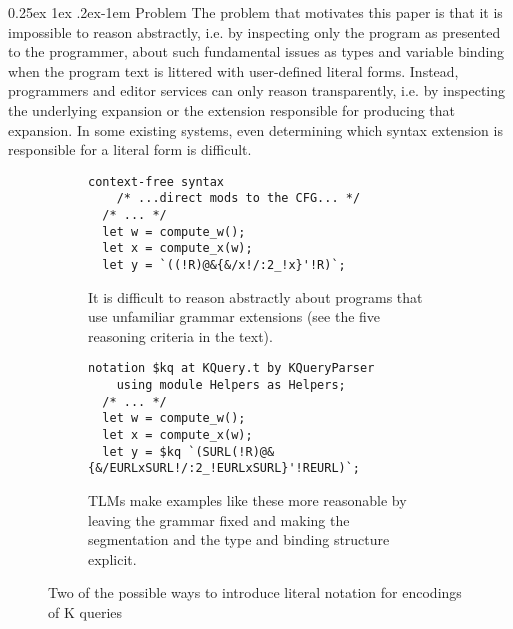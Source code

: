 \documentclass[acmsmall,review,anonymous]{acmart}\settopmatter{printfolios=true,printccs=false,printacmref=false}
\makeatletter
\renewcommand{\paragraph}{%
  \@startsection{paragraph}{4}%
  {\z@}{0.25ex \@plus 1ex \@minus .2ex}{-1em}%
  {\normalfont\normalsize\bfseries}%
}
\makeatother
\begin{document}
\paragraph{Problem} The problem that motivates this paper is that it is impossible to reason abstractly, i.e. by inspecting only the program as presented to the programmer, about such fundamental issues as types and variable binding when the program text is littered with  user-defined literal forms. Instead, programmers and editor services can only reason transparently, i.e. by inspecting the underlying expansion or the extension responsible for producing that expansion. In some existing systems, even determining which syntax extension is responsible for a literal form is difficult.
\newcommand*\Suppressnumber{%
  \lst@AddToHook{OnNewLine}{%
    \let\thelstnumber\relax%
     \advance\c@lstnumber-\@ne\relax%
    }%
}

\newcommand*\Reactivatenumber{%
  \lst@AddToHook{OnNewLine}{%
   \let\thelstnumber\origthelstnumber%
   \advance\c@lstnumber\@ne\relax}%
}


\begin{figure}[t!]
\begin{subfigure}[t]{0.48\textwidth}
\begin{lstlisting}[xleftmargin=-2pt, morekeywords={context,free,syntax}]
  context-free syntax 
    /* ...direct mods to the CFG... */
  /* ... */
  let w = compute_w();
  let x = compute_x(w);
  let y = `((!R)@&{&/x!/:2_!x}'!R)`;
\end{lstlisting}
\vspace{-5px}
\caption{It is difficult to reason abstractly about programs that use unfamiliar grammar extensions (see the five reasoning criteria in the text).}
\label{fig:K-dialect}
\end{subfigure}
\hfill
\begin{subfigure}[t]{0.51\textwidth}
\begin{lstlisting}[xleftmargin=-2pt]
  notation $kq at KQuery.t by KQueryParser 
    using module Helpers as Helpers;
  /* ... */
  let w = compute_w();
  let x = compute_x(w);
  let y = $kq `(SURL(!R)@&{&/EURLxSURL!/:2_!EURLxSURL}'!REURL)`;
\end{lstlisting}
\vspace{-5px}
\caption{TLMs make examples like these more reasonable by leaving the grammar fixed and making the segmentation and the type and binding structure explicit.}
\label{fig:K-tsm-example}
\end{subfigure}
\vspace{3px}
\caption{Two of the possible ways to introduce literal notation for encodings of K queries}
\vspace{-10px}
\end{figure}
\end{document}
